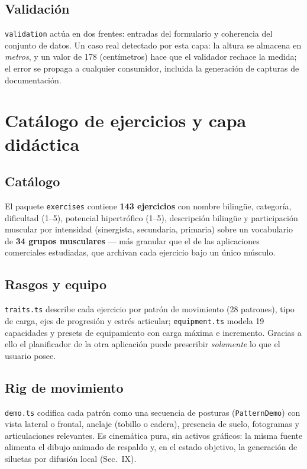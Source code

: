 \documentclass[conference]{IEEEtran}
\newcommand{\code}[1]{\texttt{\small #1}}
\begin{document}
\subsection{Validaci\'on}
\code{validation} act\'ua en dos frentes: entradas del formulario y coherencia
del conjunto de datos. Un caso real detectado por esta capa: la altura se
almacena en \emph{metros}, y un valor de 178 (cent\'imetros) hace que el
validador rechace la medida; el error se propaga a cualquier consumidor, incluida
la generaci\'on de capturas de documentaci\'on.

\section{Cat\'alogo de ejercicios y capa did\'actica}

\subsection{Cat\'alogo}
El paquete \code{exercises} contiene \textbf{143 ejercicios} con nombre biling\"ue,
categor\'ia, dificultad (1--5), potencial hipertr\'ofico (1--5), descripci\'on
biling\"ue y participaci\'on muscular por intensidad (sinergista, secundaria,
primaria) sobre un vocabulario de \textbf{34 grupos musculares} --- m\'as
granular que el de las aplicaciones comerciales estudiadas, que archivan cada
ejercicio bajo un \'unico m\'usculo.

\subsection{Rasgos y equipo}
\code{traits.ts} describe cada ejercicio por patr\'on de movimiento (28
patrones), tipo de carga, ejes de progresi\'on y estr\'es articular;
\code{equipment.ts} modela 19 capacidades y presets de equipamiento con carga
m\'axima e incremento. Gracias a ello el planificador de la otra aplicaci\'on
puede prescribir \emph{solamente} lo que el usuario posee.

\subsection{Rig de movimiento}
\code{demo.ts} codifica cada patr\'on como una secuencia de posturas
(\code{PatternDemo}) con vista lateral o frontal, anclaje (tobillo o cadera),
presencia de suelo, fotogramas y articulaciones relevantes. Es cinem\'atica
pura, sin activos gr\'aficos: la misma fuente alimenta el dibujo animado de
respaldo y, en el estado objetivo, la generaci\'on de siluetas por difusi\'on
local (Sec.~IX).
\end{document}
